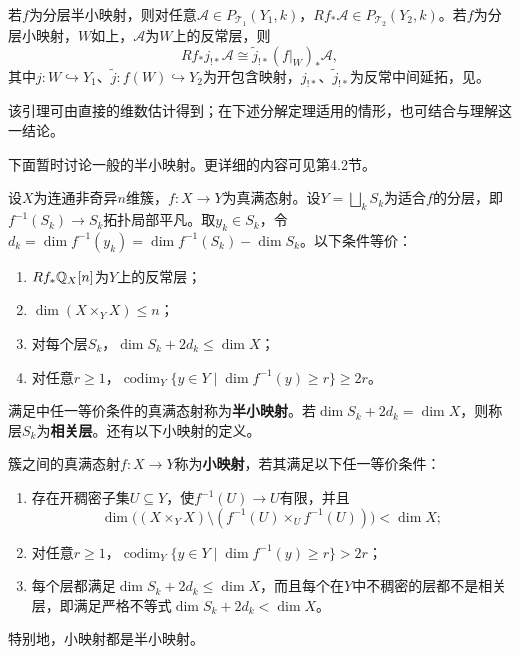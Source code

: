 \begin{lemma}\label{L22S1O4}
若$f$为分层半小映射，则对任意$\mathcal A\in P_{\mathcal T_1}(Y_1,k)$，$Rf_*\mathcal A\in P_{\mathcal T_2}(Y_2,k)$。若$f$为分层小映射，$W$如上，$\mathcal A$为$W$上的反常层，则
\[Rf_*j_{!*}\mathcal A\cong\widetilde j_{!*}(f|_W)_*\mathcal A,\]
其中$j:W\hookrightarrow Y_1$、$\widetilde j:f(W)\hookrightarrow Y_2$为开包含映射，$j_{!*}$、$\widetilde j_{!*}$为反常中间延拓，见。
\end{lemma}
该引理可由直接的维数估计得到；在下述分解定理适用的情形，也可结合与理解这一结论。

下面暂时讨论一般的半小映射。更详细的内容可见第4.2节。
\begin{proposition}\label{L22S1O5}
设$X$为连通非奇异$n$维簇，$f:X\to Y$为真满态射。设$Y=\bigsqcup_k S_k$为适合$f$的分层，即$f^{-1}(S_k)\to S_k$拓扑局部平凡。取$y_k\in S_k$，令$d_k=\dim f^{-1}(y_k)=\dim f^{-1}(S_k)-\dim S_k$。以下条件等价：
\begin{enumerate}[label=\arabic*.]
\item $Rf_*\mathbb{Q}_X[n]$为$Y$上的反常层；
\item $\dim(X\times_YX)\le n$；
\item 对每个层$S_k$，$\dim S_k+2d_k\le\dim X$；
\item 对任意$r\ge1$，$\operatorname{codim}_Y\{y\in Y\mid\dim f^{-1}(y)\ge r\}\ge2r$。
\end{enumerate}
\end{proposition}
满足中任一等价条件的真满态射称为\textbf{半小映射}。若$\dim S_k+2d_k=\dim X$，则称层$S_k$为\textbf{相关层}。还有以下小映射的定义。
\begin{definition}\label{L22S1O6}
簇之间的真满态射$f:X\to Y$称为\textbf{小映射}，若其满足以下任一等价条件：
\begin{enumerate}[label=\arabic*.]
\item 存在开稠密子集$U\subseteq Y$，使$f^{-1}(U)\to U$有限，并且
\[\dim\bigl((X\times_YX)\setminus(f^{-1}(U)\times_Uf^{-1}(U))\bigr)<\dim X;\]
\item 对任意$r\ge1$，$\operatorname{codim}_Y\{y\in Y\mid\dim f^{-1}(y)\ge r\}>2r$；
\item 每个层都满足$\dim S_k+2d_k\le\dim X$，而且每个在$Y$中不稠密的层都不是相关层，即满足严格不等式$\dim S_k+2d_k<\dim X$。
\end{enumerate}
特别地，小映射都是半小映射。
\end{definition}
